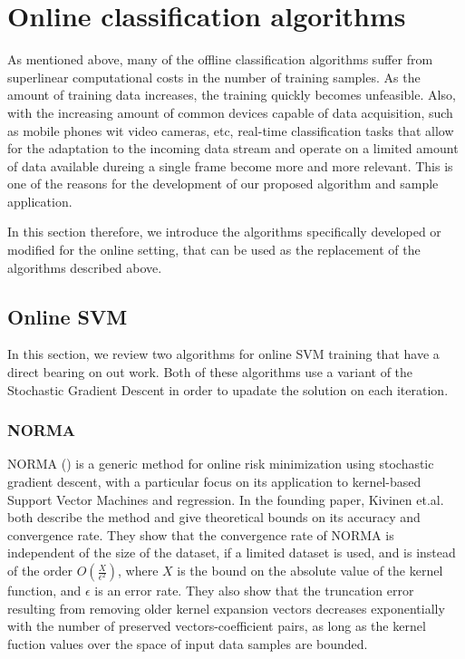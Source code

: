 \section{Online classification algorithms}

As mentioned above, many of the offline classification algorithms suffer from superlinear computational costs in the number of training samples. As the amount of training data increases, the training quickly becomes unfeasible. Also, with the increasing amount of common devices capable of data acquisition, such as mobile phones wit video cameras, etc, real-time classification tasks that allow for the adaptation to the incoming data stream and operate on a limited amount of data available dureing a single frame become more and more relevant. This is one of the reasons for the development of our proposed algorithm and sample application.  

In this section therefore, we introduce the algorithms specifically developed or modified for the online setting, that can be used as the replacement of the algorithms described above. 
\subsection{Online SVM}
In this section, we review two algorithms for online SVM training that have a direct bearing on out work. Both of these algorithms use a variant of the Stochastic Gradient Descent in order to upadate the solution on each iteration. 
\subsubsection{NORMA}
\label{NORMAIntro}
NORMA (\cite{Norma}) is a generic method for online risk minimization using stochastic gradient descent, with a particular focus on its application to kernel-based Support Vector Machines and regression. In the founding paper,  Kivinen et.al. both describe the method and give theoretical  bounds on its accuracy and convergence rate. They show that the convergence rate of NORMA is independent of the size of the dataset, if a limited dataset is used, and is instead of the order $O(\frac{X}{\epsilon^2})$, where $X$ is the bound on the absolute value of the kernel function, and $\epsilon$ is an error rate. 
They also show that the truncation error resulting from removing older kernel expansion vectors decreases exponentially with the number of preserved vectors-coefficient pairs, as long as the kernel fuction values over the space of input data samples are bounded. 

